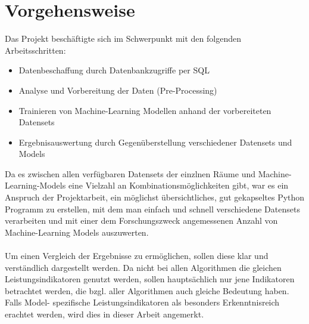 



\section{Vorgehensweise}


Das Projekt beschäftigte sich im Schwerpunkt mit den folgenden Arbeitsschritten:
\begin{itemize}
    \item Datenbeschaffung durch Datenbankzugriffe per SQL
    \item Analyse und Vorbereitung der Daten (Pre-Processing)
    \item Trainieren von Machine-Learning Modellen anhand der vorbereiteten Datensets
    \item Ergebnisauswertung durch Gegenüberstellung verschiedener Datensets und Models
\end{itemize}
Da es zwischen allen verfügbaren Datensets der einzlnen Räume und Machine-Learning-Models eine Vielzahl an
Kombinationsmöglichkeiten gibt, war es ein Anspruch der Projektarbeit, ein möglichst übersichtliches, 
gut gekapseltes Python Programm zu erstellen, mit dem man einfach und schnell verschiedene Datensets  
verarbeiten und mit einer dem Forschungszweck angemessenen Anzahl von Machine-Learning Models auszuwerten. \\\\
Um einen Vergleich der Ergebnisse zu ermöglichen, sollen diese klar und verständlich dargestellt werden. 
Da nicht bei allen Algorithmen die gleichen Leistungsindikatoren genutzt werden, sollen hauptsächlich nur 
jene Indikatoren betrachtet werden, die bzgl. aller Algorithmen auch gleiche Bedeutung haben. Falls Model-
spezifische Leistungsindikatoren als besonders Erkenntnisreich erachtet werden, wird dies in dieser Arbeit
angemerkt.